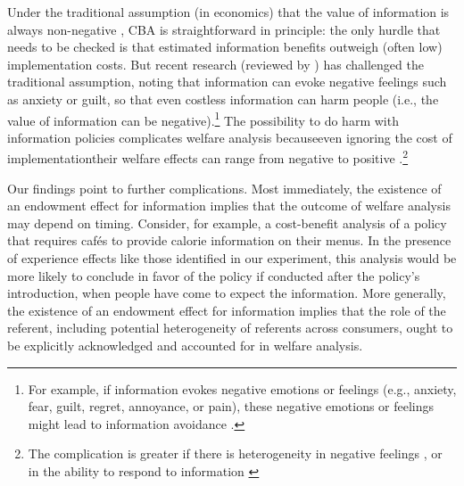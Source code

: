Under the traditional assumption (in economics) that the value of information is always non-negative \citep{stiglerEconomicsInformation1961}, CBA is straightforward in principle: the only hurdle that needs to be checked is that estimated information benefits outweigh (often low) implementation costs. But recent research (reviewed by \citet{golmanInformationAvoidance2017}) has challenged the traditional assumption, noting that information can evoke negative feelings such as anxiety or guilt, so that even costless information can harm people (i.e., the value of information can be negative).\footnote{For example, if information evokes negative emotions or feelings (e.g., anxiety, fear, guilt, regret, annoyance, or pain), these negative emotions or feelings might lead to information avoidance \citep{koszegiHealthAnxietyPatient2003,danaExploitingMoralWiggle2007,karlssonOstrichEffectSelective2009,sweenyInformationAvoidanceWho2010,osterOptimalExpectationsLimited2013,grossmanStrategicIgnoranceRobustness2014,hertwigHomoIgnoransDeliberately2016,onwezenWhenIndifferenceAmbivalence2016,savolainenApproachingAffectiveBarriers2016,thunstromStrategicSelfignorance2016,grossmanSelfImageWillfulIgnorance2017,damgaardHiddenCostsNudging2018,thunstromEndogenousAttentionCosts2019,sunsteinRuiningPopcornWelfare2019}.} The possibility to do harm with information policies complicates welfare analysis because\textemdash even ignoring the cost of implementation\textemdash their welfare effects can range from negative to positive \citep{damgaardHiddenCostsNudging2018, allcottWelfareEffectsNudges2019,buteraDeadweightLossSocial2019,rafiqHowMuchCalorie2019,thunstromWelfareEffectsNudges2020}.\footnote{The complication is greater if there is heterogeneity in negative feelings \citep{sunsteinRuiningPopcornWelfare2019}, or in the ability to respond to information \citep{robertsNudgeProofDistributiveJustice2018}}

Our findings point to further complications. Most immediately, the existence of an endowment effect for information implies that the outcome of welfare analysis may depend on timing. Consider, for example, a cost-benefit analysis of a policy that requires cafés to provide calorie information on their menus. In the presence of experience effects like those identified in our experiment, this analysis would be more likely to conclude in favor of the policy if conducted after the policy’s introduction, when people have come to expect the information. More generally, the existence of an endowment effect for information implies that the role of the referent, including potential heterogeneity of referents across consumers, ought to be explicitly acknowledged and accounted for in welfare analysis.


